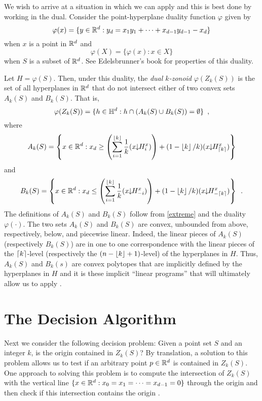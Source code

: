 \documentclass[lotsofwhite]{patmorin}
\newcommand{\drop}{\!\!\downarrow\!\!}
\newcommand{\dual}{\varphi}
\begin{document}
We wish to arrive at a situation in which we can apply 
and this is best done by working in the dual.
Consider the point-hyperplane duality function
$\dual$ given by 
\[
    \dual(x)=\{y\in\R^d : y_d = x_1y_1 +\cdots +x_{d-1}y_{d-1} - x_d \}
\] 
when $x$ is a point in $\mathbb{R}^d$ and
\[
     \dual(X) = \{\dual(x) : x\in X\}
\]
when $S$ is a subset of $\mathbb{R}^d$.  See Edelsbrunner's book \cite{eXX}
for properties of this duality. 

Let $H=\dual(S)$.  Then,
under this duality, the \emph{dual $k$-zonoid} $\dual(Z_k(S))$ is the set 
of all hyperplanes in $\mathbb{R}^d$
that do not intersect either of two convex sets $A_k(S)$ and $B_k(S)$.
That is,
\[
     \dual(Z_k(S)) = \{ h\in\Hy^d : h\cap(A_k(S)\cup B_k(S)) = \emptyset \} \enspace ,
\]
where
\begin{equation}
   A_k(S) = \left\{x\in\R^d: x_d \ge 
\left(\sum_{i=1}^{\floor{k}} \frac{1}{k}(x\drop H_i^x)\right) +
          (1-\floor{k}/k)(x\drop H_{\ceil{k}}^x) \right\}  \eqlabel{ra}
\end{equation} 
and
\begin{equation}
   B_k(S) = \left\{x\in\R^d: x_d \le 
\left(\sum_{i=1}^{\floor{k}} \frac{1}{k}(x\drop H_{-i}^x)\right) +
          (1-\floor{k}/k)(x\drop H_{-\ceil{k}}^x) \right\} \enspace .
\end{equation}
The definitions of $A_k(S)$ and $B_k(S)$ follow from \eqref{extreme}
and the duality $\dual(\cdot)$.
The two sets $A_k(S)$ and $B_k(S)$ are convex, unbounded from above,
respectively, below, and piecewise linear.  Indeed, the linear pieces
of $A_k(S)$ (respectively $B_k(S)$) are in one to one correspondence
with the linear pieces of the $\left\lceil k \right\rceil$-level (respectively
the $(n-\left\lfloor k \right\rfloor+1)$-level) of the hyperplanes in $H$.  Thus,
$A_k(S)$ and $B_k(s)$ are convex polytopes that are implicitly defined
by the hyperplanes in $H$ and it is these implicit ``linear programs''
that will ultimately allow us to apply .


\section{The Decision Algorithm}

Next we consider the following decision problem:  Given a point set
$S$ and an integer $k$, is the origin contained in $Z_k(S)$?  By
translation, a solution to this problem allows us to test if an
arbitrary point $p\in\mathbb{R}^d$ is contained in $Z_k(S)$. One approach to
solving this problem is to compute the intersection of $Z_k(S)$ with
the vertical line $\{x\in\mathbb{R}^d:x_0=x_1=\cdots=x_{d-1}=0\}$ through the origin
and then check if this intersection contains the origin \cite{gm04}. 
\end{document}

